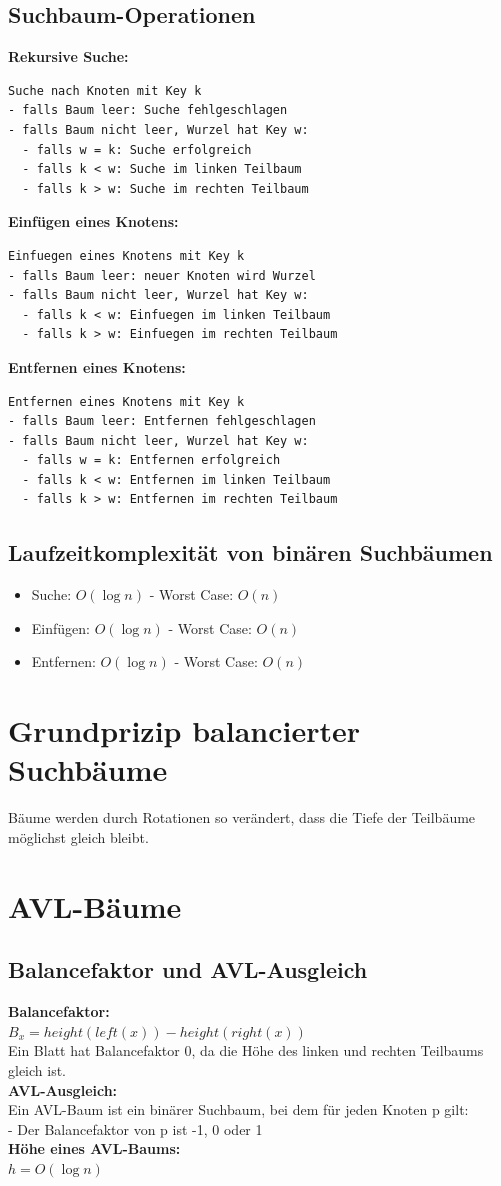 \documentclass{scrreprt}
\newcommand\tab[1][1cm]{\hspace*{#1}}
\begin{document}
\subsection{Suchbaum-Operationen}
\textbf{Rekursive Suche:}
\begin{lstlisting}
Suche nach Knoten mit Key k
- falls Baum leer: Suche fehlgeschlagen
- falls Baum nicht leer, Wurzel hat Key w:
  - falls w = k: Suche erfolgreich
  - falls k < w: Suche im linken Teilbaum
  - falls k > w: Suche im rechten Teilbaum
\end{lstlisting}
\textbf{Einfügen eines Knotens:}
\begin{lstlisting}
Einfuegen eines Knotens mit Key k
- falls Baum leer: neuer Knoten wird Wurzel
- falls Baum nicht leer, Wurzel hat Key w:
  - falls k < w: Einfuegen im linken Teilbaum
  - falls k > w: Einfuegen im rechten Teilbaum
\end{lstlisting}
\textbf{Entfernen eines Knotens:}
\begin{lstlisting}
Entfernen eines Knotens mit Key k
- falls Baum leer: Entfernen fehlgeschlagen
- falls Baum nicht leer, Wurzel hat Key w:
  - falls w = k: Entfernen erfolgreich
  - falls k < w: Entfernen im linken Teilbaum
  - falls k > w: Entfernen im rechten Teilbaum
\end{lstlisting}
\subsection{Laufzeitkomplexität von binären Suchbäumen}
\begin{itemize}
  \item Suche: $O(\log n)$ - Worst Case: $O(n)$
  \item Einfügen: $O(\log n)$ - Worst Case: $O(n)$
  \item Entfernen: $O(\log n)$ - Worst Case: $O(n)$
\end{itemize}
\section{Grundprizip balancierter Suchbäume}
Bäume werden durch Rotationen so verändert, dass die Tiefe der Teilbäume möglichst gleich bleibt.
\section{AVL-Bäume}
\subsection{Balancefaktor und AVL-Ausgleich}
\textbf{Balancefaktor:}
\\\tab $B_x = height(left(x)) - height(right(x))$
\\ Ein Blatt hat Balancefaktor 0, da die Höhe des linken und rechten Teilbaums gleich ist.
\\\textbf{AVL-Ausgleich:}
\\ Ein AVL-Baum ist ein binärer Suchbaum, bei dem für jeden Knoten p gilt:
\\ - Der Balancefaktor von p ist -1, 0 oder 1
\\\textbf{Höhe eines AVL-Baums:}
\\\tab $h = O(\log n)$
\end{document}
